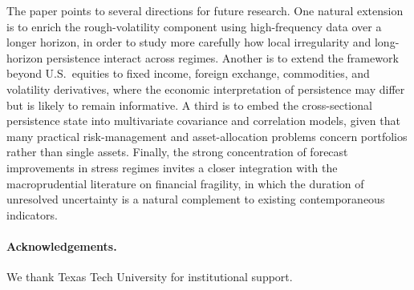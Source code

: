 \documentclass[11pt,a4paper]{article}
\begin{document}
The paper points to several directions for future research. One natural
extension is to enrich the rough-volatility component using
high-frequency data over a longer horizon, in order to study more
carefully how local irregularity and long-horizon persistence interact
across regimes. Another is to extend the framework beyond U.S.\
equities to fixed income, foreign exchange, commodities, and volatility
derivatives, where the economic interpretation of persistence may
differ but is likely to remain informative. A third is to embed the
cross-sectional persistence state into multivariate covariance and
correlation models, given that many practical risk-management and
asset-allocation problems concern portfolios rather than single
assets. Finally, the strong concentration of forecast improvements in
stress regimes invites a closer integration with the macroprudential
literature on financial fragility, in which the duration of
unresolved uncertainty is a natural complement to existing
contemporaneous indicators.

\paragraph{Acknowledgements.}
We thank Texas Tech University for institutional support.



\end{document}
